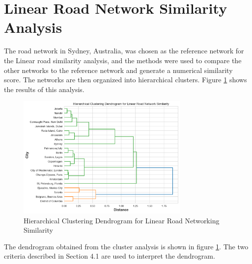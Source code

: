 \section{Linear Road Network Similarity Analysis}

The road network in Sydney, Australia, was chosen as the reference network for the Linear road similarity analysis, and the methods were used to compare the other networks to the reference network and generate a numerical similarity score. The networks are then organized into hierarchical clusters. Figure \ref{fig:Hierarchical Clustering Dendrogram for Linear Road Networking Similarity} shows the results of this analysis.

\begin{figure}[!ht]
\centering
\includegraphics[width=0.75\textwidth,center]{picture/Linear/linear_dendrogram2.png}
\caption[Hierarchical Clustering Dendrogram for Linear Road Networking Similarity]{Hierarchical Clustering Dendrogram for Linear Road Networking Similarity}
\label{fig:Hierarchical Clustering Dendrogram for Linear Road Networking Similarity}
\end{figure}

The dendrogram obtained from the cluster analysis is shown in figure \ref{fig:Hierarchical Clustering Dendrogram for Linear Road Networking Similarity}. The two criteria described in Section 4.1 are used to interpret the dendrogram.

